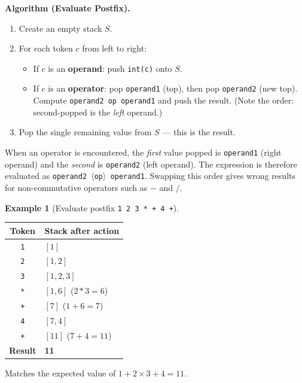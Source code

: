 \documentclass[11pt, a4paper, notitlepage]{report}
\theoremstyle{definition}
\theoremstyle{remark}
\theoremstyle{definition}
\newtheorem{example}[theorem]{Example}
\begin{document}
\textbf{Algorithm (Evaluate Postfix).}

\begin{enumerate}
  \item Create an empty stack $S$.
  \item For each token $c$ from left to right:
    \begin{itemize}
      \item If $c$ is an \textbf{operand}: push \texttt{int(c)} onto $S$.
      \item If $c$ is an \textbf{operator}: pop \texttt{operand1} (top), then pop
            \texttt{operand2} (new top).  Compute \texttt{operand2 op operand1} and push
            the result.  (Note the order: second-popped is the \emph{left} operand.)
    \end{itemize}
  \item Pop the single remaining value from $S$ --- this is the result.
\end{enumerate}

\begin{warning}[title={Warning: Operand Ordering When Evaluating}]
When an operator is encountered, the \emph{first} value popped is \texttt{operand1}
(right operand) and the \emph{second} is \texttt{operand2} (left operand).  The
expression is therefore evaluated as \texttt{operand2 $\langle$op$\rangle$ operand1}.
Swapping this order gives wrong results for non-commutative operators such as $-$ and $/$.
\end{warning}

\begin{example}[Evaluate postfix \texttt{1 2 3 * + 4 +}]
\label{ex:eval-postfix-simple}

\begin{center}
\begin{tabular}{@{} c l @{}}
\toprule
\textbf{Token} & \textbf{Stack after action} \\
\midrule
\texttt{1} & $[1]$ \\
\texttt{2} & $[1, 2]$ \\
\texttt{3} & $[1, 2, 3]$ \\
\texttt{*} & $[1, 6]$ \quad ($2*3=6$) \\
\texttt{+} & $[7]$ \quad ($1+6=7$) \\
\texttt{4} & $[7, 4]$ \\
\texttt{+} & $[11]$ \quad ($7+4=11$) \\
\midrule
\textbf{Result} & \textbf{11} \\
\bottomrule
\end{tabular}
\end{center}

Matches the expected value of $1 + 2 \times 3 + 4 = 11$.
\end{example}
\end{document}

